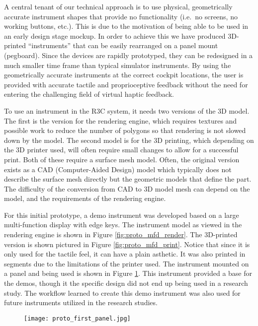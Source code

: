 A central tenant of our technical approach is to use physical, geometrically accurate instrument shapes that provide no functionality (i.e.\ no screens, no working buttons, etc.).
This is due to the motivation of being able to be used in an early design stage mockup.
In order to achieve this we have produced 3D-printed ``instruments'' that can be easily rearranged on a panel mount (pegboard).
Since the devices are rapidly prototyped, they can be redesigned in a much smaller time frame than typical simulator instruments.
By using the geometrically accurate instruments at the correct cockpit locations, the user is provided with accurate tactile and proprioceptive feedback without the need for entering the challenging field of virtual haptic feedback.

To use an instrument in the R3C system, it needs two versions of the 3D model.
The first is the version for the rendering engine, which requires textures and possible work to reduce the number of polygons so that rendering is not slowed down by the model.
The second model is for the 3D printing, which depending on the 3D printer used, will often require small changes to allow for a successful print.
Both of these require a surface mesh model.
Often, the original version exists as a CAD (Computer-Aided Design) model which typically does not describe the surface mesh directly but the geometric models that define the part.
The difficulty of the conversion from CAD to 3D model mesh can depend on the model, and the requirements of the rendering engine.

For this initial prototype, a demo instrument was developed based on a large multi-function display with edge keys.
The instrument model as viewed in the rendering engine is shown in Figure \ref{fig:proto_mfd_render}.
The 3D-printed version is shown pictured in Figure \ref{fig:proto_mfd_print}.
Notice that since it is only used for the tactile feel, it can have a plain asthetic.
It was also printed in segments due to the limitations of the printer used.
The instrument mounted on a panel and being used is shown in Figure \ref{fig:proto_first_panel}.
This instrument provided a base for the demos, though it the specific design did not end up being used in a research study.
The workflow learned to create this demo instrument was also used for future instruments utilized in the research studies.

\begin{figure}
    \centering
    \texttt{[image: proto\_first\_panel.jpg]}
    \caption{}
    \label{fig:proto_first_panel}
\end{figure}


